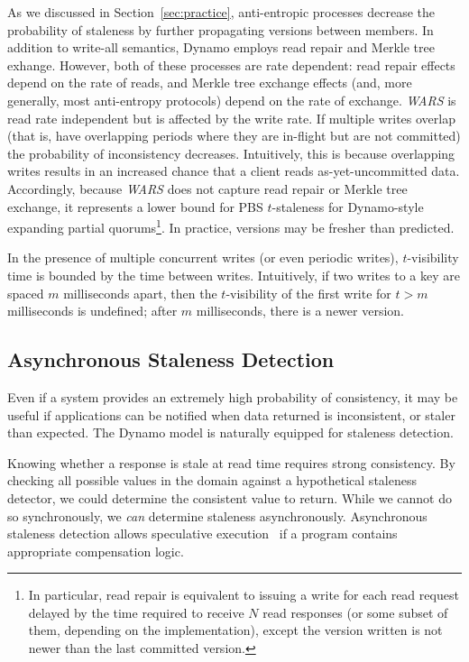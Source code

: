 \documentclass{vldb}
\begin{document}
As we discussed in Section~\ref{sec:practice}, anti-entropic processes
decrease the probability of staleness by further propagating versions
between members.  In addition to write-all semantics, Dynamo employs
read repair and Merkle tree exhange. However, both of these processes
are rate dependent: read repair effects depend on the rate of reads,
and Merkle tree exchange effects (and, more generally, most
anti-entropy protocols) depend on the rate of exchange.  \textit{WARS}
is read rate independent but is affected by the write rate.  If
multiple writes overlap (that is, have overlapping periods where they
are in-flight but are not committed) the probability of inconsistency
decreases.  Intuitively, this is because overlapping writes results in
an increased chance that a client reads as-yet-uncommitted data.
Accordingly, because \textit{WARS} does not capture read repair or
Merkle tree exchange, it represents a lower bound for PBS
$t$-staleness for Dynamo-style expanding partial quorums\footnote{In
  particular, read repair is equivalent to issuing a write
  for each read request delayed by the time required to receive $N$
  read responses (or some subset of them, depending on the
  implementation), except the version written is not newer than the
  last committed version.}. In practice, versions may be fresher than
predicted.

In the presence of multiple concurrent writes (or even periodic
writes), $t$-visibility time is bounded by the time between writes.
Intuitively, if two writes to a key are spaced $m$ milliseconds apart,
then the $t$-visibility of the first write for $t > m$ milliseconds is
undefined; after $m$ milliseconds, there is a newer version.

\subsection{Asynchronous Staleness Detection}

Even if a system provides an extremely high probability of
consistency, it  may be useful if applications can be notified when
data returned is inconsistent, or staler than expected.  The Dynamo
model is naturally equipped for staleness detection.

Knowing whether a response is stale at read time requires strong
consistency.  By checking all possible values in the domain against a
hypothetical staleness detector, we could determine the consistent
value to return.  While we cannot do so synchronously, we \textit{can}
determine staleness asynchronously.  Asynchronous staleness detection
allows speculative execution~\cite{nsdispeculation} if a program
contains appropriate compensation logic.
\end{document}
